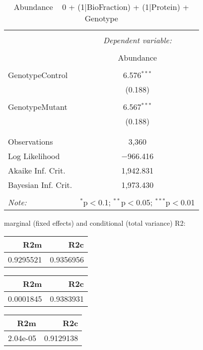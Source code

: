 \documentclass[11pt]{report}
\begin{document}
\begin{table}[!htbp] \centering 
  \caption{Abundance ~ 0 + (1|BioFraction) + (1|Protein) + Genotype} 
  \label{} 
\begin{tabular}{@{\extracolsep{5pt}}lc} 
\\[-1.8ex]\hline 
\hline \\[-1.8ex] 
 & \multicolumn{1}{c}{\textit{Dependent variable:}} \\ 
\cline{2-2} 
\\[-1.8ex] & Abundance \\ 
\hline \\[-1.8ex] 
 GenotypeControl & 6.576$^{***}$ \\ 
  & (0.188) \\ 
  & \\ 
 GenotypeMutant & 6.567$^{***}$ \\ 
  & (0.188) \\ 
  & \\ 
\hline \\[-1.8ex] 
Observations & 3,360 \\ 
Log Likelihood & $-$966.416 \\ 
Akaike Inf. Crit. & 1,942.831 \\ 
Bayesian Inf. Crit. & 1,973.430 \\ 
\hline 
\hline \\[-1.8ex] 
\textit{Note:}  & \multicolumn{1}{r}{$^{*}$p$<$0.1; $^{**}$p$<$0.05; $^{***}$p$<$0.01} \\ 
\end{tabular} 
\end{table} 
marginal (fixed effects) and conditional (total variance) R2:

\begin{tabular}{r|r}
\hline
R2m & R2c\\
\hline
0.9295521 & 0.9356956\\
\hline
\end{tabular}

\begin{tabular}{r|r}
\hline
R2m & R2c\\
\hline
0.0001845 & 0.9383931\\
\hline
\end{tabular}

\begin{tabular}{r|r}
\hline
R2m & R2c\\
\hline
2.04e-05 & 0.9129138\\
\hline
\end{tabular}
\end{document}
